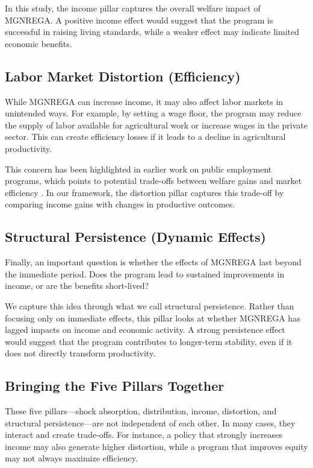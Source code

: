 \documentclass[12pt]{article}
\begin{document}
In this study, the income pillar captures the overall welfare impact of MGNREGA. A positive income effect would suggest that the program is successful in raising living standards, while a weaker effect may indicate limited economic benefits.

\subsection{Labor Market Distortion (Efficiency)}

While MGNREGA can increase income, it may also affect labor markets in unintended ways. For example, by setting a wage floor, the program may reduce the supply of labor available for agricultural work or increase wages in the private sector. This can create efficiency losses if it leads to a decline in agricultural productivity.

This concern has been highlighted in earlier work on public employment programs, which points to potential trade-offs between welfare gains and market efficiency \citep{Muralidharan2017}. In our framework, the distortion pillar captures this trade-off by comparing income gains with changes in productive outcomes.

\subsection{Structural Persistence (Dynamic Effects)}

Finally, an important question is whether the effects of MGNREGA last beyond the immediate period. Does the program lead to sustained improvements in income, or are the benefits short-lived?

We capture this idea through what we call structural persistence. Rather than focusing only on immediate effects, this pillar looks at whether MGNREGA has lagged impacts on income and economic activity. A strong persistence effect would suggest that the program contributes to longer-term stability, even if it does not directly transform productivity.

\subsection{Bringing the Five Pillars Together}

These five pillars—shock absorption, distribution, income, distortion, and structural persistence—are not independent of each other. In many cases, they interact and create trade-offs. For instance, a policy that strongly increases income may also generate higher distortion, while a program that improves equity may not always maximize efficiency.
\end{document}
